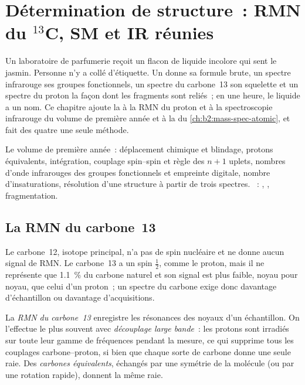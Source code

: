 \chapter{Détermination de structure~: RMN du \texorpdfstring{$^{13}$C}{13C}, SM et IR réunies}\label{ch:b2:structure-determination}

Un laboratoire de parfumerie reçoit un flacon de liquide incolore qui sent le jasmin. Personne n'y a
collé d'étiquette. Un  donne sa formule brute, un spectre infrarouge ses groupes
fonctionnels, un spectre du carbone~13 son squelette et un spectre du proton la façon dont les fragments
sont reliés~; en une heure, le liquide a un nom. Ce chapitre ajoute la  à la RMN du
proton et à la spectroscopie infrarouge du volume de première année et à la  du
\cref{ch:b2:mass-spec-atomic}, et fait des quatre une seule méthode.

\begin{recall}
Le volume de première année~: déplacement chimique et blindage, protons équivalents, intégration,
couplage spin--spin et règle des $n + 1$ uplets, nombres d'onde infrarouges des groupes fonctionnels et
empreinte digitale, nombre d'insaturations, résolution d'une structure à partir de trois spectres.
~: , , fragmentation.
\end{recall}

\section{La RMN du carbone~13}

Le carbone~12, isotope principal, n'a pas de spin nucléaire et ne donne aucun signal de RMN. Le
carbone~13 a un spin
$\tfrac12$, comme le proton, mais il ne représente que 1.1~\% du carbone naturel et son signal est plus
faible, noyau pour noyau, que celui d'un proton~; un spectre du carbone exige donc davantage
d'échantillon ou davantage d'acquisitions.

\begin{definition}\label{def:b2:structure-determination:c13}
La \emph{RMN du carbone~13} enregistre les résonances des noyaux 
d'un échantillon. On l'effectue le plus souvent avec \emph{découplage large bande}~: les protons sont
irradiés sur toute leur gamme de fréquences pendant la mesure, ce qui supprime tous les couplages
carbone--proton, si bien que chaque sorte de carbone donne une seule raie. Des \emph{carbones
équivalents}, échangés par une symétrie de la molécule
(ou par une rotation rapide), donnent la même raie.
\end{definition}

